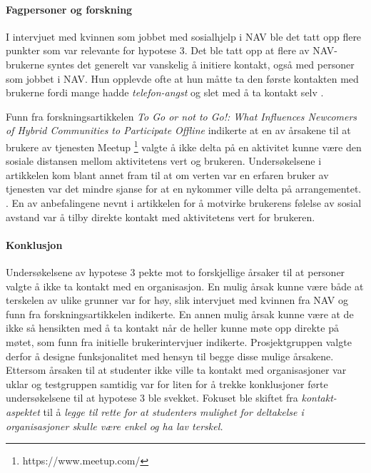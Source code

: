 \paragraph{Fagpersoner og forskning}
I intervjuet med kvinnen som jobbet med sosialhjelp i NAV ble det tatt opp flere punkter som var relevante for hypotese 3. Det ble tatt opp at flere av NAV-brukerne syntes det generelt var vanskelig å initiere kontakt, også med personer som jobbet i NAV. Hun opplevde ofte at hun måtte ta den første kontakten med brukerne fordi mange hadde {\em telefon-angst} og slet med å ta kontakt selv \cite{NAV-INTERVJU:16}.

Funn fra forskningsartikkelen {\em To Go or not to Go!: What Influences Newcomers of Hybrid Communities to Participate Offline} indikerte at en av årsakene til at brukere av tjenesten Meetup \footnote{https://www.meetup.com/} valgte å ikke delta på en aktivitet kunne være den sosiale distansen mellom aktivitetens vert og brukeren. Undersøkelsene i artikkelen kom blant annet fram til at om verten var en erfaren bruker av tjenesten var det mindre sjanse for at en nykommer ville delta på arrangementet. . En av anbefalingene nevnt i artikkelen for å motvirke brukerens følelse av sosial avstand var å tilby direkte kontakt med aktivitetens vert for brukeren. \cite{NEWCOMERS:4:CT17}

\paragraph{Konklusjon}
Undersøkelsene av hypotese 3 pekte mot to forskjellige årsaker til at personer valgte å ikke ta kontakt med en organisasjon. En mulig årsak kunne være både at terskelen av ulike grunner var for høy, slik intervjuet med kvinnen fra NAV og funn fra forskningsartikkelen indikerte. En annen mulig årsak kunne være at de ikke så hensikten med å ta kontakt når de heller kunne møte opp direkte på møtet, som funn fra initielle brukerintervjuer indikerte. Prosjektgruppen valgte derfor å designe funksjonalitet med hensyn til begge disse mulige årsakene. Ettersom årsaken til at studenter ikke ville ta kontakt med organisasjoner var uklar og testgruppen samtidig var for liten for å trekke konklusjoner førte undersøkelsene til at hypotese 3 ble svekket. Fokuset ble skiftet fra {\em kontakt-aspektet} til å {\em legge til rette for at studenters mulighet for deltakelse i organisasjoner skulle være enkel og ha lav terskel.}


